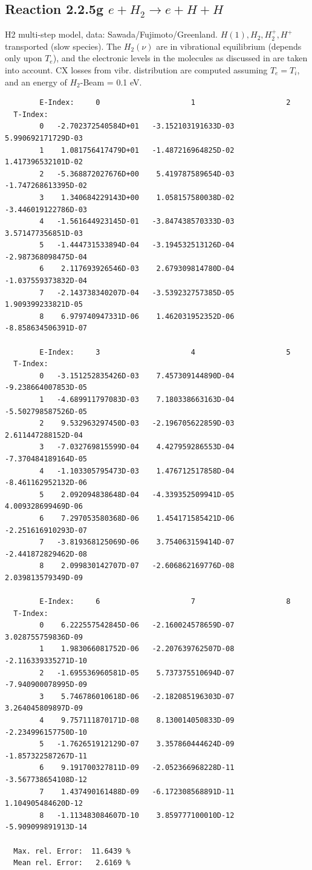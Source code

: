 \documentclass[12pt,dvips]{article}
\begin{document}
\subsection{
Reaction 2.2.5g   $e + H_2   \rightarrow e + H + H  $
}

H2 multi-step model,
data: Sawada/Fujimoto/Greenland.
$  H(1), H_2, H_2^+, H^+ $ transported (slow species).
The $H_2(\nu)$ are in vibrational equilibrium
(depends only upon $T_e$), and the electronic levels
in the molecules as discussed in \cite{kn:Sawada} are taken into
account. CX losses from vibr. distribution are computed assuming $T_e =
T_i$, and an energy of $H_2$-Beam  = 0.1 eV.
\begin{small}\begin{verbatim}
        E-Index:     0                     1                     2
  T-Index:
        0   -2.702372540584D+01   -3.152103191633D-03    5.990692171729D-03
        1    1.081756417479D+01   -1.487216964825D-02    1.417396532101D-02
        2   -5.368872027676D+00    5.419787589654D-03   -1.747268613395D-02
        3    1.340684229143D+00    1.058157580038D-02   -3.446019122786D-03
        4   -1.561644923145D-01   -3.847438570333D-03    3.571477356851D-03
        5   -1.444731533894D-04   -3.194532513126D-04   -2.987368098475D-04
        6    2.117693926546D-03    2.679309814780D-04   -1.037559373832D-04
        7   -2.143738340207D-04   -3.539232757385D-05    1.909399233821D-05
        8    6.979740947331D-06    1.462031952352D-06   -8.858634506391D-07

        E-Index:     3                     4                     5
  T-Index:
        0   -3.151252835426D-03    7.457309144890D-04   -9.238664007853D-05
        1   -4.689911797083D-03    7.180338663163D-04   -5.502798587526D-05
        2    9.532963297450D-03   -2.196705622859D-03    2.611447288152D-04
        3   -7.032769815599D-04    4.427959286553D-04   -7.370484189164D-05
        4   -1.103305795473D-03    1.476712517858D-04   -8.461162952132D-06
        5    2.092094838648D-04   -4.339352509941D-05    4.009328699469D-06
        6    7.297053580368D-06    1.454171585421D-06   -2.251616910293D-07
        7   -3.819368125069D-06    3.754063159414D-07   -2.441872829462D-08
        8    2.099830142707D-07   -2.606862169776D-08    2.039813579349D-09

        E-Index:     6                     7                     8
  T-Index:
        0    6.222557542845D-06   -2.160024578659D-07    3.028755759836D-09
        1    1.983066081752D-06   -2.207639762507D-08   -2.116339335271D-10
        2   -1.695536960581D-05    5.737375510694D-07   -7.940900078995D-09
        3    5.746786010618D-06   -2.182085196303D-07    3.264045809897D-09
        4    9.757111870171D-08    8.130014050833D-09   -2.234996157750D-10
        5   -1.762651912129D-07    3.357860444624D-09   -1.857322587267D-11
        6    9.191700327811D-09   -2.052366968228D-11   -3.567738654108D-12
        7    1.437490161488D-09   -6.172308568891D-11    1.104905484620D-12
        8   -1.113483084607D-10    3.859777100010D-12   -5.909099891913D-14

  Max. rel. Error:  11.6439 %
  Mean rel. Error:   2.6169 %
\end{verbatim}\end{small}
\end{document}
